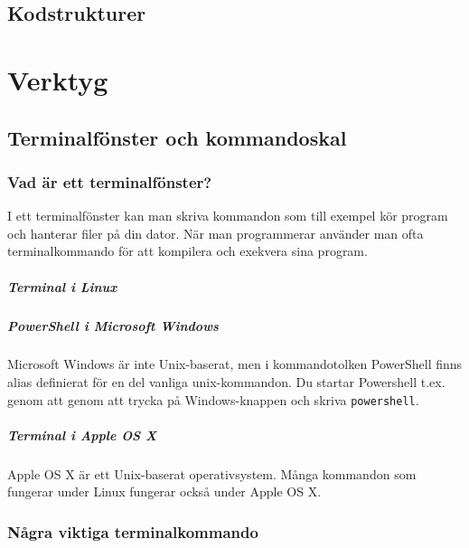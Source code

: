\documentclass[a4paper]{compendium}
\begin{document}



\chapter{Kodstrukturer}
\lipsum






\part{Verktyg}     %

\appendix

\chapter{Terminalfönster och kommandoskal}

\section{Vad är ett terminalfönster?}

I ett terminalfönster kan man skriva kommandon som till exempel kör program och hanterar filer på din dator. När man programmerar använder man ofta terminalkommando för att kompilera och exekvera sina program.   
 
\subsubsection{Terminal i Linux}

\subsubsection{PowerShell i Microsoft Windows}
Microsoft Windows är inte Unix-baserat, men i kommandotolken PowerShell finns alias definierat för en del vanliga unix-kommandon. Du startar Powershell t.ex. genom att genom att trycka på Windows-knappen och skriva \texttt{powershell}.

\subsubsection{Terminal i Apple OS X}
Apple OS X är ett Unix-baserat operativsystem. Många kommandon som fungerar under Linux fungerar också under Apple OS X.

\section{Några viktiga terminalkommando}
\end{document}
